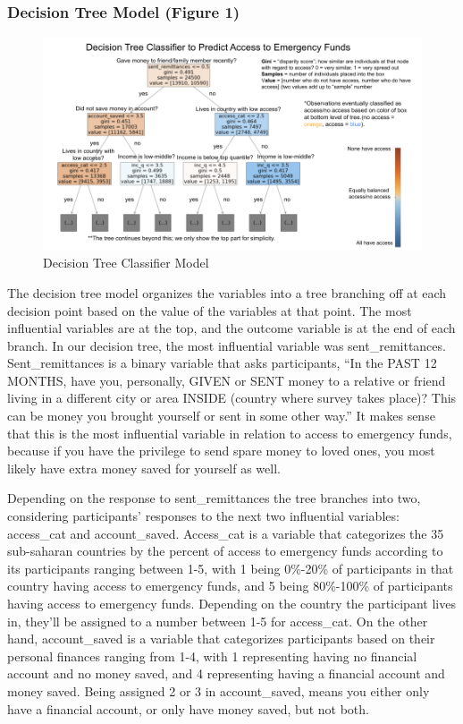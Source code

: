 \documentclass[water,article,submit,moreauthors,pdftex]{mdpi}
\begin{document}
\hypertarget{decision-tree-model-figure-1}{%
\subsubsection{Decision Tree Model (Figure
1)}\label{decision-tree-model-figure-1}}

\begin{figure}
\centering
\includegraphics[width=\textwidth,height=0.5\textheight]{images/decision_tree_annotated.png}
\caption{Decision Tree Classifier Model}
\end{figure}

The decision tree model organizes the variables into a tree branching
off at each decision point based on the value of the variables at that
point. The most influential variables are at the top, and the outcome
variable is at the end of each branch. In our decision tree, the most
influential variable was sent\_remittances. Sent\_remittances is a
binary variable that asks participants, ``In the PAST 12 MONTHS, have
you, personally, GIVEN or SENT money to a relative or friend living in a
different city or area INSIDE (country where survey takes place)? This
can be money you brought yourself or sent in some other way.'' It makes
sense that this is the most influential variable in relation to access
to emergency funds, because if you have the privilege to send spare
money to loved ones, you most likely have extra money saved for yourself
as well.

Depending on the response to sent\_remittances the tree branches into
two, considering participants' responses to the next two influential
variables: access\_cat and account\_saved. Access\_cat is a variable
that categorizes the 35 sub-saharan countries by the percent of access
to emergency funds according to its participants ranging between 1-5,
with 1 being 0\%-20\% of participants in that country having access to
emergency funds, and 5 being 80\%-100\% of participants having access to
emergency funds. Depending on the country the participant lives in,
they'll be assigned to a number between 1-5 for access\_cat. On the
other hand, account\_saved is a variable that categorizes participants
based on their personal finances ranging from 1-4, with 1 representing
having no financial account and no money saved, and 4 representing
having a financial account and money saved. Being assigned 2 or 3 in
account\_saved, means you either only have a financial account, or only
have money saved, but not both.
\end{document}
